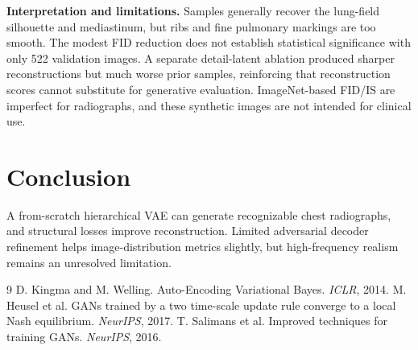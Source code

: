 \documentclass{article}
\begin{document}
\textbf{Interpretation and limitations.} Samples generally recover the lung-field silhouette and mediastinum, but ribs and fine pulmonary markings are too smooth. The modest FID reduction does not establish statistical significance with only 522 validation images. A separate detail-latent ablation produced sharper reconstructions but much worse prior samples, reinforcing that reconstruction scores cannot substitute for generative evaluation. ImageNet-based FID/IS are imperfect for radiographs, and these synthetic images are not intended for clinical use.

\section{Conclusion}
A from-scratch hierarchical VAE can generate recognizable chest radiographs, and structural losses improve reconstruction. Limited adversarial decoder refinement helps image-distribution metrics slightly, but high-frequency realism remains an unresolved limitation.

\vspace{-3pt}
\begin{thebibliography}{9}
\small
{} D. Kingma and M. Welling. Auto-Encoding Variational Bayes. \emph{ICLR}, 2014.
 M. Heusel et al. GANs trained by a two time-scale update rule converge to a local Nash equilibrium. \emph{NeurIPS}, 2017.
 T. Salimans et al. Improved techniques for training GANs. \emph{NeurIPS}, 2016.
\end{thebibliography}
\end{document}

